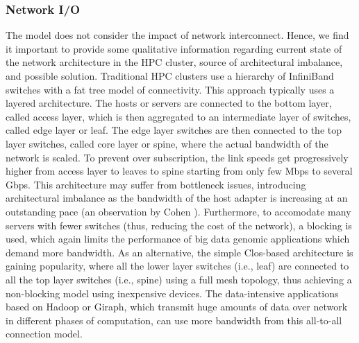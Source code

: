 \documentclass[journal]{IEEEtran}
\begin{document}
\subsubsection{Network I/O}
The model does not consider the impact of network interconnect. Hence, we find it important to provide some qualitative information regarding current state of the network architecture in the HPC cluster, source of architectural imbalance, and possible solution. Traditional HPC clusters use a hierarchy of InfiniBand switches with a fat tree model of connectivity. This approach typically uses a layered architecture. The hosts or servers are connected to the bottom layer, called access layer, which is then aggregated to an intermediate layer of switches, called edge layer or leaf. The edge layer switches are then connected to the top layer switches, called core layer or spine, where the actual bandwidth of the network is scaled. To prevent over subscription, the link speeds get progressively higher from access layer to leaves to spine starting from only few Mbps to several Gbps. This architecture may suffer from bottleneck issues, introducing architectural imbalance as the bandwidth of the host adapter is increasing at an outstanding pace (an observation by Cohen \cite{Balance:cohen2009applying}). Furthermore, to accomodate many servers with fewer switches (thus, reducing the cost of the network), a blocking is used, which again limits the performance of big data genomic applications which demand more bandwidth. As an alternative, the simple Clos-based architecture is gaining popularity, where all the lower layer switches (i.e., leaf) are connected to all the top layer switches (i.e., spine) using a full mesh topology, thus achieving a non-blocking model using inexpensive devices. The data-intensive applications based on Hadoop or Giraph, which transmit huge amounts of data over network in different phases of computation, can use more bandwidth from this all-to-all connection model. 
\end{document}
